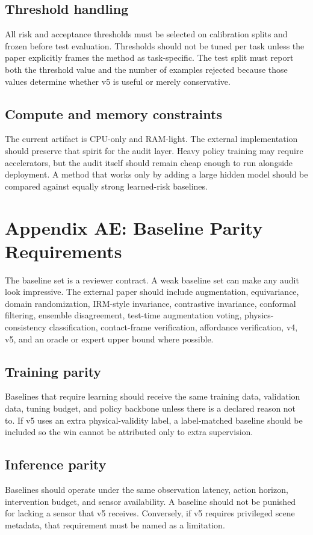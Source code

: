 \documentclass{article}
\begin{document}
\subsection{Threshold handling}
All risk and acceptance thresholds must be selected on calibration splits and frozen before test evaluation. Thresholds should not be tuned per task unless the paper explicitly frames the method as task-specific. The test split must report both the threshold value and the number of examples rejected because those values determine whether v5 is useful or merely conservative.

\subsection{Compute and memory constraints}
The current artifact is CPU-only and RAM-light. The external implementation should preserve that spirit for the audit layer. Heavy policy training may require accelerators, but the audit itself should remain cheap enough to run alongside deployment. A method that works only by adding a large hidden model should be compared against equally strong learned-risk baselines.


\section{Appendix AE: Baseline Parity Requirements}
The baseline set is a reviewer contract. A weak baseline set can make any audit look impressive. The external paper should include augmentation, equivariance, domain randomization, IRM-style invariance, contrastive invariance, conformal filtering, ensemble disagreement, test-time augmentation voting, physics-consistency classification, contact-frame verification, affordance verification, v4, v5, and an oracle or expert upper bound where possible.

\subsection{Training parity}
Baselines that require learning should receive the same training data, validation data, tuning budget, and policy backbone unless there is a declared reason not to. If v5 uses an extra physical-validity label, a label-matched baseline should be included so the win cannot be attributed only to extra supervision.

\subsection{Inference parity}
Baselines should operate under the same observation latency, action horizon, intervention budget, and sensor availability. A baseline should not be punished for lacking a sensor that v5 receives. Conversely, if v5 requires privileged scene metadata, that requirement must be named as a limitation.
\end{document}
